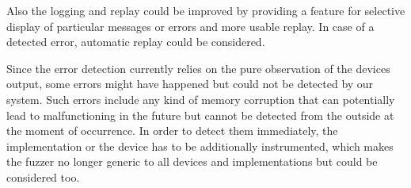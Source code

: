 Also the logging and replay could be improved by providing a feature for selective display of particular messages or errors and more usable replay. In case of a detected error, automatic replay could be considered.

Since the error detection currently relies on the pure observation of the devices output, some errors might have happened but could not be detected by our system. Such errors include any kind of memory corruption that can potentially lead to malfunctioning in the future but cannot be detected from the outside at the moment of occurrence. In order to detect them immediately, the implementation or the device has to be additionally instrumented, which makes the fuzzer no longer generic to all devices and implementations but could be considered too.
